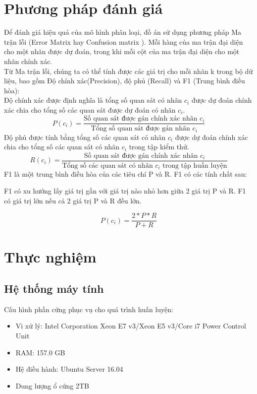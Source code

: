 \section{Phương pháp đánh giá}
Để đánh giá hiệu quả của mô hình phân loại, đồ án sử dụng phương pháp Ma trận lỗi (Error Matrix hay Confusion matrix \cite{confusion}). Mỗi hàng của ma trận đại diện cho một nhãn được dự đoán, trong khi mỗi cột của ma trận đại diện cho một nhãn chính xác. \\
Từ Ma trận lỗi, chúng ta có thể tính được các giá trị cho mỗi nhãn k trong bộ dữ liệu, bao gồm Độ chính xác(Precision), độ phủ (Recall) và F1 (Trung bình điều hòa): \\
\indent Độ chính xác được định nghĩa là tổng số quan sát có nhãn $c_i$ được dự đoán chính xác chia cho tổng số các quan sát được dự đoán có nhãn $c_i$.
\begin{equation}
P(c_i) = \frac{\text{Số quan sát được gán chính xác nhãn }c_i}{\text{Tổng số quan sát được gán nhãn }c_i}
\end{equation}
\indent Độ phủ được tính bằng tổng số các quan sát có nhãn $c_i$ được dự đoán chính xác chia cho tổng số các quan sát có nhãn $c_i$ trong tập kiểm thử.
\begin{equation}
R(c_i) = \frac{\text{Số quan sát được gán chính xác nhãn }c_i}{\text{Tổng số các quan sát có nhãn $c_i$ trong tập huấn luyện}}
\end{equation}
F1 là một trung bình điều hòa của các tiêu chí P và R. F1 có các tính chất sau: 
\begin{itemize}
\ii F1 có xu hướng lấy giá trị gần với giá trị nào nhỏ hơn giữa 2 giá trị P và R.
\ii F1 có giá trị lớn nếu cả 2 giá trị P và R đều lớn.
\end{itemize}
\begin{equation}
P(c_i) = \frac{2 * P * R}{P + R}
\end{equation}

\section{Thực nghiệm}
\subsection{Hệ thống máy tính}
Cấu hình phần cứng phục vụ cho quá trình huấn luyện:
\begin{itemize}
    \item Vi xử lý: Intel Corporation Xeon E7 v3/Xeon E5 v3/Core i7 Power Control Unit
    \item RAM: 157.0 GB
    \item Hệ điều hành: Ubuntu Server 16.04
    \item Dung lượng ổ cứng 2TB
\end{itemize}

